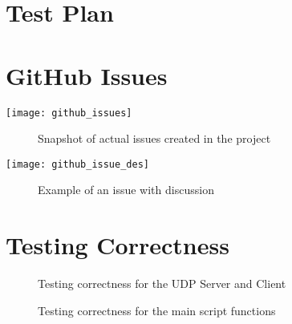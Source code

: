 \begin{appendices}

%
\chapter{Test Plan}


%
\chapter{GitHub Issues}
\begin{center}
	\texttt{[image: github\_issues]}
	\begin{figure}[h]
		\caption{Snapshot of actual issues created in the project}
		\label{ref:GitHubIssues}
	\end{figure}			
\end{center}

\begin{center}
	\texttt{[image: github\_issue\_des]}
	\begin{figure}[h]
		\caption{Example of an issue with discussion}
		\label{ref:GitHubIssueExample}
	\end{figure}	
\end{center}

%
\chapter{Testing Correctness}
\begin{center}
	\label{ref:testingCorrect}
	
	\begin{figure}[h]
		\caption{Testing correctness for the UDP Server and Client}
		\label{ref:testingUDP}
	\end{figure}
	
		
	\begin{figure}[h]
		\caption{Testing correctness for the main script functions}	
		\label{ref:testingScript}
	\end{figure}
\end{center}
\end{appendices}
